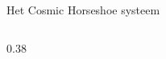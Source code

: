 \documentclass[aspectratio=169,xcolor=dvipsnames]{beamer}
\begin{document}
\begin{frame}{Het Cosmic Horseshoe systeem}
\begin{columns}[T]
        \begin{column}{0.38\textwidth}
        \end{column}

    \end{columns}
\end{frame}
\end{document}

